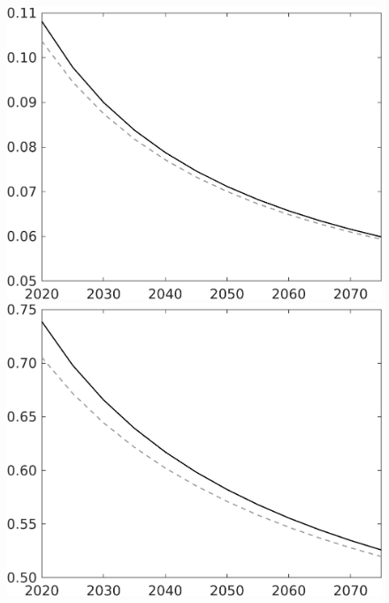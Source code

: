 \begin{figure}[h!!]
\begin{minipage}[]{0.32\textwidth}
	\end{minipage}		
	\begin{minipage}[]{0.32\textwidth}
		\includegraphics[width=1\textwidth]{../../codding_model/own_basedOnFried/optimalPol_010922_revision/figures/all_13Sept22/CompTaul_LFBAU_Reg0_sg_spillover0_nsk0_xgr0_sep1_countec0_GovRev1_etaa0.79_lgd0.png}
	\end{minipage}	
	\begin{minipage}[]{0.32\textwidth}
		\includegraphics[width=1\textwidth]{../../codding_model/own_basedOnFried/optimalPol_010922_revision/figures/all_13Sept22/CompTaul_LFBAU_Reg0_sn_spillover0_nsk0_xgr0_sep1_countec0_GovRev1_etaa0.79_lgd0.png}

\end{minipage}
\end{figure}
